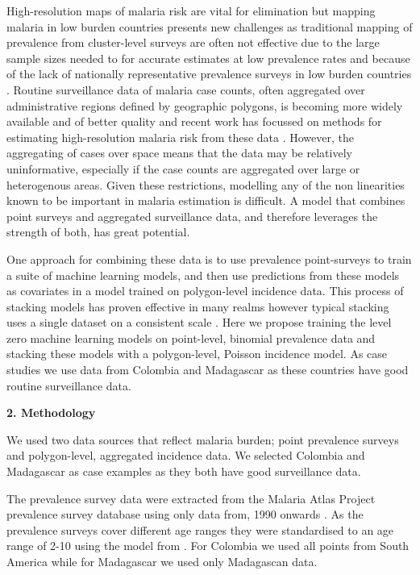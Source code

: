 \documentclass[11pt]{article}
\begin{document}
High-resolution maps of malaria risk are vital for elimination but mapping malaria in low burden countries presents new challenges as traditional mapping of prevalence from cluster-level surveys \citep{gething2011new, bhatt2017improved, gething2012long} are often not effective due to the large sample sizes needed to for accurate estimates at low prevalence rates and because of the lack of nationally representative prevalence surveys in low burden countries \citep{sturrock2016mapping, sturrock2014fine}. 
Routine surveillance data of malaria case counts, often aggregated over administrative regions defined by geographic polygons, is becoming more widely available and of better quality and recent work has focussed on methods for estimating high-resolution malaria risk from these data \citep{sturrock2014fine, wilson2017pointless, law2018variational, taylor2017continuous, li2012log}. 
However, the aggregating of cases over space means that the data may be relatively uninformative, especially if the case counts are aggregated over large or heterogenous areas. 
Given these restrictions, modelling any of the non linearities known to be important in malaria estimation is difficult. 
A model that combines point surveys and aggregated surveillance data, and therefore leverages the strength of both, has great potential.
 
One approach for combining these data is to use prevalence point-surveys to train a suite of machine learning models, and then use predictions from these models as covariates in a model trained on polygon-level incidence data. 
This process of stacking models has proven effective in many realms however typical stacking uses a single dataset on a consistent scale \citep{sill2009feature, bhatt2017improved}. 
Here we propose training the level zero machine learning models on point-level, binomial prevalence data and stacking these models with a polygon-level, Poisson incidence model. 
As case studies we use data from Colombia and Madagascar as these countries have  good routine surveillance data.


{\bf 2. Methodology}

We used two data sources that reflect malaria burden; point prevalence surveys and polygon-level, aggregated incidence data. 
We selected Colombia and Madagascar as case examples as they both have good surveillance data.

The prevalence survey data were extracted from the Malaria Atlas Project prevalence survey database using only data from, 1990 onwards \citep{bhatt2015effect}. 
As the prevalence surveys cover different age ranges they were standardised to an age range of 2-10 using the model from \citep{smith2007standardizing}. 
For Colombia we used all points from South America while for Madagascar we used only Madagascan data.
\end{document}
